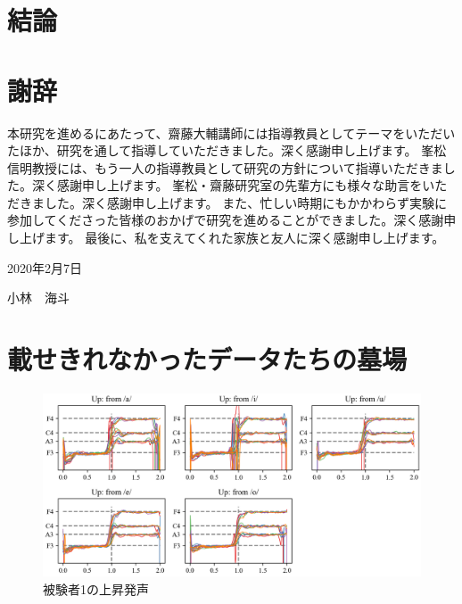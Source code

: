 \documentclass[10ptj,a4j,dvipdfmx,uplatex, oneside, openany]{jsbook}%
\begin{document}
\chapter{結論}


\chapter{謝辞}
本研究を進めるにあたって、齋藤大輔講師には指導教員としてテーマをいただいたほか、研究を通して指導していただきました。深く感謝申し上げます。
峯松信明教授には、もう一人の指導教員として研究の方針について指導いただきました。深く感謝申し上げます。
峯松・齋藤研究室の先輩方にも様々な助言をいただきました。深く感謝申し上げます。
また、忙しい時期にもかかわらず実験に参加してくださった皆様のおかげで研究を進めることができました。深く感謝申し上げます。
最後に、私を支えてくれた家族と友人に深く感謝申し上げます。

\begin{flushright}
2020年2月7日

小林　海斗
\end{flushright}




\appendix
\chapter{載せきれなかったデータたちの墓場}

\begin{figure}[htbp]
    \begin{center}
      \includegraphics[clip,width=16.0cm]{F0_up_1.png}
      \caption{被験者1の上昇発声}
      \label{fig:u1}
    \end{center}
\end{figure}
\end{document}
